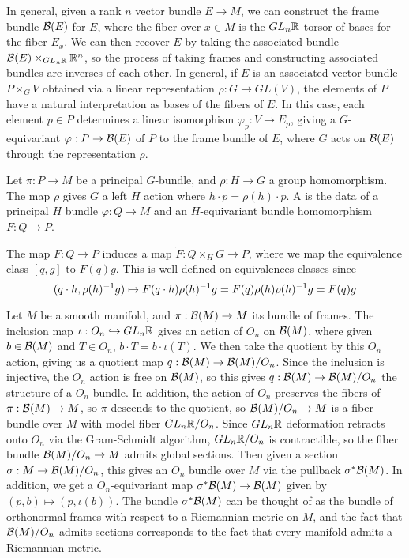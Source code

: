 In general, given a rank $n$ vector bundle $E \to M$, we can construct the
frame bundle  $\mathcal{B}(E)$ for $E$, where the fiber over $x \in M$ is the
$GL_n\mathbb{R}$-torsor of bases for the fiber $E_x$. We can then
recover $E$ by taking the associated bundle $\mathcal{B}(E) \times_{GL_n\mathbb{R}} \mathbb{R}^n$,
so the process of taking frames and constructing associated bundles are inverses
of each other. In general, if $E$ is an associated vector bundle
$P \times_G V$ obtained via a linear representation $\rho : G \to GL(V)$, the
elements of $P$ have a natural interpretation as bases of the fibers of $E$.
In this case, each element $p \in P$ determines a linear isomorphism
$\varphi_p : V \to E_p$, giving a $G$-equivariant $\varphi : P \to \mathcal{B}(E)$ of
$P$ to the frame bundle of $E$, where $G$ acts on $\mathcal{B}(E)$ through the
representation $\rho$.
%
\begin{defn}
 Let $\pi : P \to M$ be a principal $G$-bundle, and $\rho : H \to G$ a group
 homomorphism. The map $\rho$ gives $G$ a left $H$ action where
 $h \cdot p = \rho(h) \cdot p$. A  is the
 data of a principal $H$ bundle $\varphi : Q \to M$ and an $H$-equivariant bundle
 homomorphism $F : Q \to P$.
\end{defn}
%
The map $F : Q \to P$ induces a map $\tilde{F} : Q \times_H G \to P$, where we
map the equivalence class $[q,g]$ to $F(q) g$. This is well defined
on equivalences classes since
\[
 (q \cdot h, \rho(h)^{-1} g) \mapsto F(q \cdot h)\rho(h)^{-1} g = F(q)\rho(h)\rho(h)^{-1} g
 = F(q)g
\]
%
\begin{exmp}
 Let $M$ be a smooth manifold, and $\pi : \mathcal{B}(M) \to M$ its bundle of frames.
 The inclusion map $\iota: O_n \hookrightarrow GL_n\mathbb{R}$ gives an action of $O_n$ on
 $\mathcal{B}(M)$, where given $b \in \mathcal{B}(M)$ and $T \in O_n$, $b \cdot T = b \cdot \iota(T)$.
 We then take the quotient by this $O_n$ action, giving us a quotient map
 $q : \mathcal{B}(M) \to \mathcal{B}(M) / O_n$. Since the inclusion is injective, the $O_n$ action
 is free on $\mathcal{B}(M)$, so this gives $q : \mathcal{B}(M) \to \mathcal{B}(M) / O_n$ the structure of a
 $O_n$ bundle. In addition, the action of $O_n$ preserves the fibers of
 $\pi : \mathcal{B}(M) \to M$, so $\pi$ descends to the quotient, so $\mathcal{B}(M) / O_n \to M$
 is a fiber bundle over $M$ with model fiber $GL_n\mathbb{R} / O_n$. Since $GL_n\mathbb{R}$ deformation
 retracts onto $O_n$ via the Gram-Schmidt algorithm, $GL_n\mathbb{R} / O_n$ is
 contractible, so the fiber bundle $\mathcal{B}(M)/ O_n \to M$ admits global sections.
 Then given a section $\sigma : M \to \mathcal{B}(M) / O_n$, this gives an $O_n$ bundle
 over $M$ via the pullback $\sigma^*\mathcal{B}(M)$. In addition, we get a $O_n$-equivariant
 map $\sigma^*\mathcal{B}(M) \to \mathcal{B}(M)$ given by $(p, b) \mapsto (p, \iota(b))$. The
 bundle $\sigma^*\mathcal{B}(M)$ can be thought of as the bundle of orthonormal frames
 with respect to a Riemannian metric on $M$, and the fact that $\mathcal{B}(M) / O_n$
 admits sections corresponds to the fact that every manifold admits a Riemannian
 metric.
\end{exmp}
